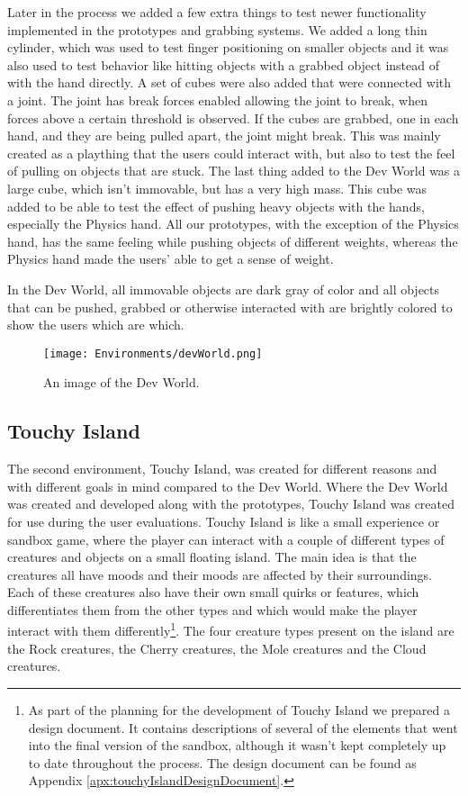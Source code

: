 Later in the process we added a few extra things to test newer functionality implemented in the prototypes and grabbing systems. We added a long thin cylinder, which was used to test finger positioning on smaller objects and it was also used to test behavior like hitting objects with a grabbed object instead of with the hand directly. A set of cubes were also added that were connected with a joint. The joint has break forces enabled allowing the joint to break, when forces above a certain threshold is observed. If the cubes are grabbed, one in each hand, and they are being pulled apart, the joint might break. This was mainly created as a plaything that the users could interact with, but also to test the feel of pulling on objects that are stuck. The last thing added to the Dev World was a large cube, which isn't immovable, but has a very high mass. This cube was added to be able to test the effect of pushing heavy objects with the hands, especially the Physics hand. All our prototypes, with the exception of the Physics hand, has the same feeling while pushing objects of different weights, whereas the Physics hand made the users' able to get a sense of weight.

In the Dev World, all immovable objects are dark gray of color and all objects that can be pushed, grabbed or otherwise interacted with are brightly colored to show the users which are which.

\begin{figure}[h]
\centering
\texttt{[image: Environments/devWorld.png]}
\caption{An image of the Dev World.}
\label{fig:devWorld}
\end{figure}

\subsection{Touchy Island}
\label{subsec:touchyIsland}
The second environment, Touchy Island, was created for different reasons and with different goals in mind compared to the Dev World. Where the Dev World was created and developed along with the prototypes, Touchy Island was created for use during the user evaluations. Touchy Island is like a small experience or sandbox game, where the player can interact with a couple of different types of creatures and objects on a small floating island. The main idea is that the creatures all have moods and their moods are affected by their surroundings. Each of these creatures also have their own small quirks or features, which differentiates them from the other types and which would make the player interact with them differently\footnote{As part of the planning for the development of Touchy Island we prepared a design document. It contains descriptions of several of the elements that went into the final version of the sandbox, although it wasn't kept completely up to date throughout the process. The design document can be found as Appendix \ref{apx:touchyIslandDesignDocument}.}. The four creature types present on the island are the Rock creatures, the Cherry creatures, the Mole creatures and the Cloud creatures.

